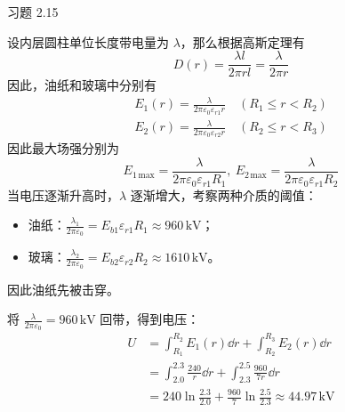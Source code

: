 \begin{problem}
	习题 2.15
	\begin{solution}
		\item[\textbf{1)}] 设内层圆柱单位长度带电量为 $\lambda$，那么根据高斯定理有
		$$
		D(r) = \frac{\lambda l}{2 \pi r l} = \frac{\lambda}{2 \pi r}
		$$
		因此，油纸和玻璃中分别有
		$$
		\begin{gathered}
			E_1(r) = \frac{\lambda}{2 \pi \varepsilon_0 \varepsilon_{r1} r} \quad (R_1 \le r < R_2) \\
			E_2(r) = \frac{\lambda}{2 \pi \varepsilon_0 \varepsilon_{r2} r} \quad (R_2 \le r < R_3)
		\end{gathered}
		$$
		因此最大场强分别为
		$$
		E_{1\,\mathrm{max}} = \frac{\lambda}{2 \pi \varepsilon_0 \varepsilon_{r1} R_1},\ E_{2\,\mathrm{max}} = \frac{\lambda}{2 \pi \varepsilon_0 \varepsilon_{r1} R_2}
		$$
		当电压逐渐升高时，$\lambda$ 逐渐增大，考察两种介质的阈值：
		\begin{itemize}
			\item 油纸：$\frac{\lambda_1}{2\pi \varepsilon_0} = E_{b1} \varepsilon_{r1} R_1 \approx 960\,\mathrm{kV}$；
			\item 玻璃：$\frac{\lambda_2}{2\pi \varepsilon_0} = E_{b2} \varepsilon_{r2} R_2 \approx 1610\,\mathrm{kV}$。
		\end{itemize}
		因此油纸先被击穿。

		\item[\textbf{2)}] 将 $\frac{\lambda}{2\pi \varepsilon_0} = 960 \,\mathrm{kV}$ 回带，得到电压：
		$$
		\begin{aligned}
			U & = \int_{R_1}^{R_2} E_1(r) \dd{r} + \int_{R_2}^{R_3} E_2(r) \dd{r} \\
			& = \int_{2.0}^{2.3} \frac{240}{r} \dd{r} + \int_{2.3}^{2.5} \frac{960}{7r} \dd{r} \\
			& = 240 \ln \frac{2.3}{2.0} + \frac{960}{7} \ln \frac{2.5}{2.3} \approx 44.97\,\mathrm{kV}
		\end{aligned}
		$$
	\end{solution}
\end{problem}

